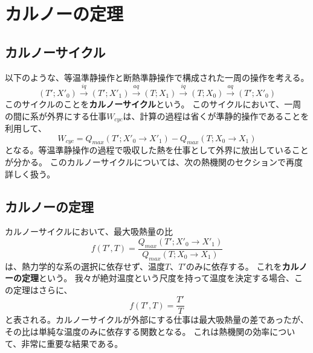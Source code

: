 \documentclass[a4paper]{jsreport}
\begin{document}
        \section{カルノーの定理}
            \subsection*{カルノーサイクル}
                以下のような、等温準静操作と断熱準静操作で構成された一周の操作を考える。
                \begin{equation} \label{eq:carnot_cycle}
                    (T'; X'_0) \xrightarrow{iq} (T'; X'_1) \xrightarrow{aq} (T; X_1) \xrightarrow{iq} (T; X_0) \xrightarrow{aq} (T'; X'_0)
                \end{equation}
                このサイクルのことを\textbf{カルノーサイクル}という。
                このサイクルにおいて、一周の間に系が外界にする仕事$W_{cyc}$は、計算の過程は省くが準静的操作であることを利用して、
                \begin{equation}
                    W_{cyc} = Q_{max}(T'; X'_0 \xrightarrow{} X'_1) - Q_{max}(T; X_0 \xrightarrow{} X_1)
                \end{equation}
                となる。等温準静操作の過程で吸収した熱を仕事として外界に放出していることが分かる。
                このカルノーサイクルについては、次の熱機関のセクションで再度詳しく扱う。

            \subsection*{カルノーの定理}
                カルノーサイクルにおいて、最大吸熱量の比
                \begin{equation}
                    f(T', T) = \frac{Q_{max}(T'; X'_0 \xrightarrow{} X'_1)}{Q_{max}(T; X_0 \xrightarrow{} X_1)}
                \end{equation}
                は、熱力学的な系の選択に依存せず、温度$T$、$T'$のみに依存する。
                これを\textbf{カルノーの定理}という。
                我々が絶対温度という尺度を持って温度を決定する場合、この定理はさらに、
                \begin{equation}
                    f(T', T) = \frac{T'}{T}
                \end{equation}
                と表される。カルノーサイクルが外部にする仕事は最大吸熱量の差であったが、その比は単純な温度のみに依存する関数となる。
                これは熱機関の効率について、非常に重要な結果である。
\end{document}
